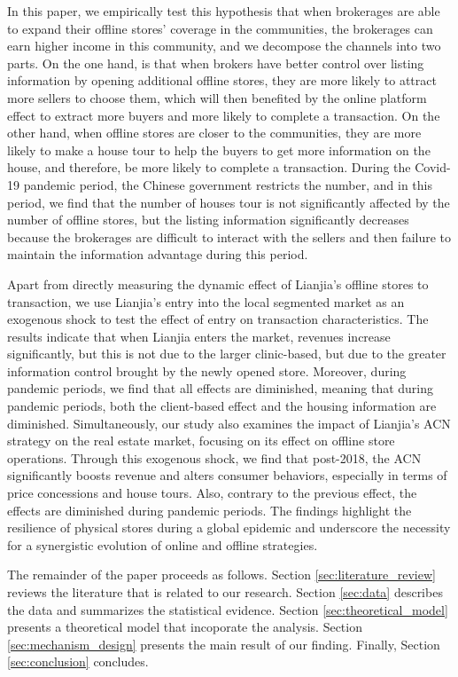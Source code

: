 \documentclass[12pt]{article}
\begin{document}
In this paper, we empirically test this hypothesis that when brokerages are able to expand their offline stores' coverage in the communities, the brokerages can earn higher income in this community, and we decompose the channels into two parts. On the one hand, is that when brokers have better control over listing information by opening additional offline stores, they are more likely to attract more sellers to choose them, which will then benefited by the online platform effect to extract more buyers and more likely to complete a transaction. On the other hand, when offline stores are closer to the communities, they are more likely to make a house tour to help the buyers to get more information on the house, and therefore, be more likely to complete a transaction. During the Covid-19 pandemic period, the Chinese government restricts the number, and in this period, we find that the number of houses tour is not significantly affected by the number of offline stores, but the listing information significantly decreases because the brokerages are difficult to interact with the sellers and then failure to maintain the information advantage during this period.

Apart from directly measuring the dynamic effect of Lianjia's offline stores to transaction, we use Lianjia's entry into the local segmented market as an exogenous shock to test the effect of entry on transaction characteristics. The results indicate that when Lianjia enters the market, revenues increase significantly, but this is not due to the larger clinic-based, but due to the greater information control brought by the newly opened store. Moreover, during pandemic periods, we find that all effects are diminished, meaning that during pandemic periods, both the client-based effect and the housing information are diminished. Simultaneously, our study also examines the impact of Lianjia's ACN strategy on the real estate market, focusing on its effect on offline store operations. Through this exogenous shock, we find that post-2018, the ACN significantly boosts revenue and alters consumer behaviors, especially in terms of price concessions and house tours. Also, contrary to the previous effect, the effects are diminished during pandemic periods. The findings highlight the resilience of physical stores during a global epidemic and underscore the necessity for a synergistic evolution of online and offline strategies.

The remainder of the paper proceeds as follows. Section \ref{sec:literature_review} reviews the literature that is related to our research. Section \ref{sec:data} describes the data and summarizes the statistical evidence. Section \ref{sec:theoretical_model} presents a theoretical model that incoporate the analysis. Section \ref{sec:mechanism_design} presents the main result of our finding. Finally, Section \ref{sec:conclusion} concludes. 
\end{document}
